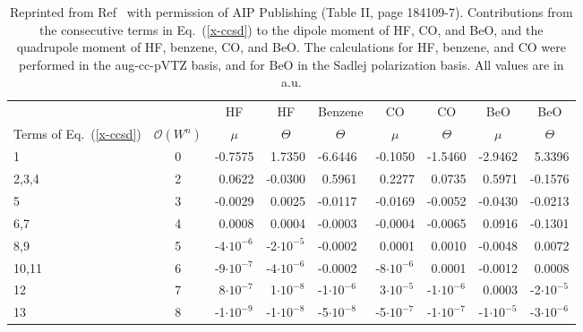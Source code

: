 \documentclass[preprint,12pt]{elsarticle}
\newcommand{\fr}[1]{Eq.~(\ref{#1})}
\begin{document}
\begin{table}[!ht]
  \begin{adjustbox}{max width=\textwidth}
   \begin{threeparttable}
     \caption{Reprinted from Ref~\citep{korona2006one} with permission of AIP Publishing (Table II, page 184109-7).
       Contributions from the consecutive terms in \fr{x-ccsd} to the dipole
       moment of HF, CO, and BeO, and the quadrupole moment of HF, benzene, CO,
       and BeO. The calculations for HF, benzene, and CO were performed in the
       aug-cc-pVTZ basis, and for BeO in the Sadlej polarization basis. All values are
in a.u.}
     \label{tabb2}
\begin{tabular}{l c lllllll}%
  &
  &   \multicolumn{1}{c}{HF}
    &   \multicolumn{1}{c}{HF}
    &   \multicolumn{1}{c}{Benzene}
    &   \multicolumn{1}{c}{CO}
    &   \multicolumn{1}{c}{CO}
    &   \multicolumn{1}{c}{BeO}
  &   \multicolumn{1}{c}{BeO}  \\
        \multicolumn{1}{l}{Terms of \fr{x-ccsd}}  
    &   \multicolumn{1}{c}{$\mathscr{O}(W^n)$}
    &   \multicolumn{1}{c}{$\mu$}
    &   \multicolumn{1}{c}{$\Theta$}
    &   \multicolumn{1}{c}{$\Theta$}
    &   \multicolumn{1}{c}{$\mu$}
    &   \multicolumn{1}{c}{$\Theta$}
    &   \multicolumn{1}{c}{$\mu$}
    &   \multicolumn{1}{c}{$\Theta$}\\
    \hline
1 & 0 & -0.7575 & $\,\,$1.7350 & -6.6446 & -0.1050 & -1.5460 & -2.9462 & $\,\,$5.3396\\
2,3,4 & 2 & $\,\,$0.0622 & -0.0300 & $\,\,$0.5961 & $\,\,$0.2277 & $\,\,$0.0735 & $\,\,$0.5971 & -0.1576\\
5 & 3 & -0.0029 & $\,\,$0.0025 & -0.0117 & -0.0169 & -0.0052 & -0.0430 & -0.0213\\
6,7 & 4 & $\,\,$0.0008 & $\,\,$0.0004 & -0.0003 & -0.0004 & -0.0065 & $\,\,$0.0916 & -0.1301\\
8,9 & 5 & -4$\cdot 10^{-6}$ & -2$\cdot 10^{-5}$ & -0.0002 & $\,\,$0.0001 & $\,\,$0.0010 & -0.0048 & $\,\,$0.0072\\
10,11 & 6 & -9$\cdot 10^{-7}$ & -4$\cdot 10^{-6}$ & -0.0002 & -8$\cdot 10^{-6}$ & $\,\,$0.0001 & -0.0012 & $\,\,$0.0008\\
12 & 7 & $\,\,$8$\cdot 10^{-7}$ & $\,\,$1$\cdot 10^{-8}$ & -1$\cdot 10^{-6}$ & $\,\,$3$\cdot 10^{-5}$ & -1$\cdot 10^{-6}$ & $\,\,$0.0003 & -2$\cdot 10^{-5}$\\
13 & 8 & -1$\cdot 10^{-9}$ & -1$\cdot 10^{-8}$ & -5$\cdot 10^{-8}$ & -5$\cdot 10^{-7}$ & -1$\cdot 10^{-7}$ & -1$\cdot 10^{-5}$ & -3$\cdot 10^{-6}$\\

\end{tabular}
\end{threeparttable}
\end{adjustbox}
\end{table}
\end{document}
